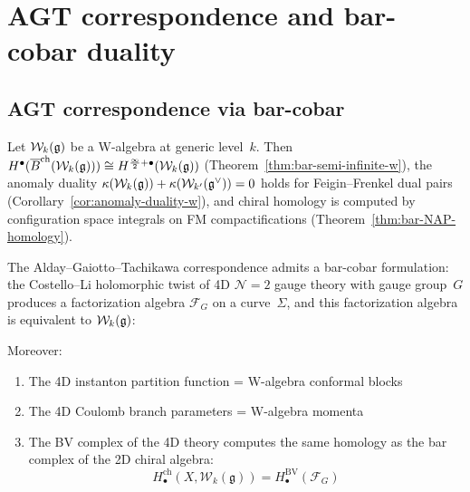 \section{AGT correspondence and bar-cobar duality}
\label{sec:mathematical-bridges}



\subsection{AGT correspondence via bar-cobar}

\begin{theorem}[AGT 2D side: bar complex = semi-infinite complex; \ClaimStatusProvedHere]
\label{thm:agt-2d-bar}
Let $\mathcal{W}_k(\mathfrak{g})$ be a W-algebra at generic level~$k$.  Then $H^\bullet(\overline{B}^{\mathrm{ch}}(\mathcal{W}_k(\mathfrak{g}))) \cong H^{\frac{\infty}{2}+\bullet}(\mathcal{W}_k(\mathfrak{g}))$ (Theorem~\ref{thm:bar-semi-infinite-w}), the anomaly duality $\kappa(\mathcal{W}_k(\mathfrak{g})) + \kappa(\mathcal{W}_{k'}(\mathfrak{g}^\vee)) = 0$ holds for Feigin--Frenkel dual pairs (Corollary~\ref{cor:anomaly-duality-w}), and chiral homology is computed by configuration space integrals on FM compactifications (Theorem~\ref{thm:bar-NAP-homology}).
\end{theorem}

\begin{conjecture}\label{conj:agt-bar-cobar}
The Alday--Gaiotto--Tachikawa correspondence \cite{AGT09} admits a
bar-cobar formulation: the Costello--Li holomorphic twist of 4D
$\mathcal{N}=2$ gauge theory with gauge group~$G$ produces a
factorization algebra $\mathcal{F}_G$ on a curve~$\Sigma$, and
this factorization algebra is equivalent to $\mathcal{W}_k(\mathfrak{g})$:

\begin{center}
\end{center}

Moreover:
\begin{enumerate}
\item The 4D instanton partition function = W-algebra conformal blocks
\item The 4D Coulomb branch parameters = W-algebra momenta
\item The BV complex of the 4D theory computes the same homology as
  the bar complex of the 2D chiral algebra:
      \[H_\bullet^{\text{ch}}(X, \mathcal{W}_k(\mathfrak{g})) = H_\bullet^{\text{BV}}(\mathcal{F}_G)\]
\end{enumerate}
\end{conjecture}


